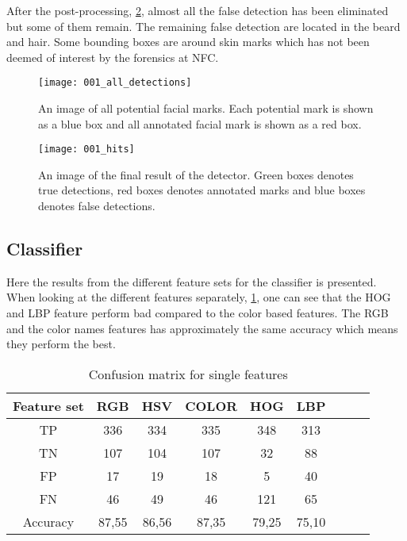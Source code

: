 After the post-processing, \cref{fig:all_hits}, almost all the false detection has been eliminated but some of them remain. The remaining false detection are located in the beard and hair. Some bounding boxes are around skin marks which has not been deemed of interest by the forensics at NFC. 

\FloatBarrier
\begin{figure}[h]
	\centering
	\texttt{[image: 001\_all\_detections]}
	\caption{An image of all potential facial marks. Each potential mark is shown as a blue box and all annotated facial mark is shown as a red box. \label{fig:all_detections}}
\end{figure}
\FloatBarrier

\FloatBarrier
\begin{figure}[h]
	\centering
	\texttt{[image: 001\_hits]}
	\caption{An image of the final result of the detector. Green boxes denotes true detections, red boxes denotes annotated marks and blue boxes denotes false detections. \label{fig:all_hits}}
\end{figure}
\FloatBarrier

\subsection{Classifier}

Here the results from the different feature sets for the classifier is presented. When looking at the different features separately, \cref{table:single_feature}, one can see that the HOG and LBP feature perform bad compared to the color based features. The RGB and the color names features has approximately the same accuracy which means they perform the best.  

\FloatBarrier
\begin{table}[h!]
\begin{center}
	\caption{Confusion matrix for single features}
	\begin{tabular}{|c|c|c|c|c|c|c|c|c|}
		\hline
		Feature set &  RGB  &  HSV  & COLOR &  HOG  &  LBP    \\ \hline
		    TP      &  336  &  334  &  335  &  348  &  313    \\ \hline
		    TN      &  107  &  104  &  107  &  32   &  88     \\ \hline
		    FP      &  17   &  19   &  18   &   5   &  40     \\ \hline
		    FN      &  46   &  49   &  46   &  121  &  65     \\ \hline
		 Accuracy   & 87,55 & 86,56 & 87,35 & 79,25 & 75,10   \\ \hline
	\end{tabular}
\label{table:single_feature}
\end{center}
\end{table}
\FloatBarrier

